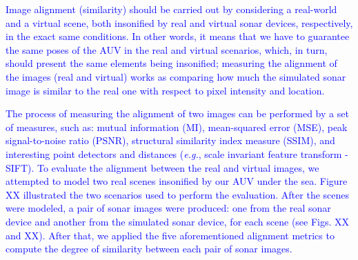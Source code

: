 \documentclass[final,5p,times]{elsarticle}
\begin{document}
\textcolor{blue}{Image alignment (similarity) should be carried out by considering a real-world and a virtual scene, both insonified by real and virtual sonar devices, respectively, in the exact same conditions. In other words, it means that we have to guarantee the same poses of the AUV in the real and virtual scenarios, which, in turn, should present the same elements being insonified; measuring the alignment of the images (real and virtual) works as comparing how much the simulated sonar image is similar to the real one with respect to pixel intensity and location.}

\textcolor{blue}{The process of measuring the alignment of two images can be performed by a set of measures, such as: mutual information (MI), mean-squared error (MSE), peak signal-to-noise ratio (PSNR), structural similarity index measure (SSIM), and interesting point detectors and distances (\textit{e.g.}, scale invariant feature transform - SIFT). To evaluate the alignment between the real and virtual images, we attempted to model two real scenes insonified by our AUV under the sea. Figure XX illustrated the two scenarios used to perform the evaluation. After the scenes were modeled, a pair of sonar images were produced: one from the real sonar device and another from the simulated sonar device, for each scene (see Figs. XX and XX). After that, we applied the five aforementioned alignment metrics to compute the degree of similarity between each pair of sonar images.}

\end{document}
